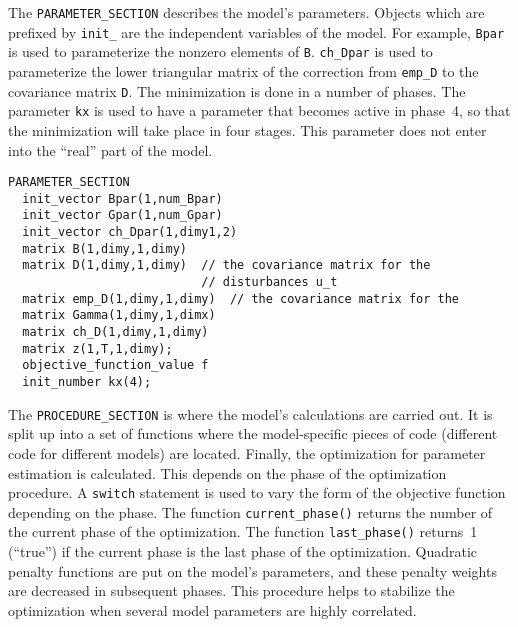 The \texttt{PARAMETER\_SECTION} describes the model's parameters.
Objects which are prefixed by \texttt{init\_} are the independent
variables of the model.  For example, \texttt{Bpar} is used to
parameterize the nonzero elements of \texttt{B}.
\texttt{ch\_Dpar} is used to parameterize the lower triangular matrix
of the correction from \texttt{emp\_D} to the covariance matrix
\texttt{D}. The minimization is done in a number of phases.
The parameter \texttt{kx} is used to have a parameter that becomes active
in phase~4, so that the minimization will take place in four stages.
This parameter does not enter into the ``real'' part of the model.

\begin{lstlisting}
PARAMETER_SECTION
  init_vector Bpar(1,num_Bpar)
  init_vector Gpar(1,num_Gpar)
  init_vector ch_Dpar(1,dimy1,2)
  matrix B(1,dimy,1,dimy)
  matrix D(1,dimy,1,dimy)  // the covariance matrix for the 
                           // disturbances u_t
  matrix emp_D(1,dimy,1,dimy)  // the covariance matrix for the 
  matrix Gamma(1,dimy,1,dimx)
  matrix ch_D(1,dimy,1,dimy)
  matrix z(1,T,1,dimy);
  objective_function_value f
  init_number kx(4);
\end{lstlisting}

The \texttt{PROCEDURE\_SECTION} is where the model's calculations
are carried out. It is split up into a set of functions where the
model-specific pieces of code (different code for different models)
are located. Finally, the optimization for parameter estimation is
calculated. This depends on the phase of the optimization procedure.
A \texttt{switch} statement is used to vary the form of the objective
function depending on the phase. The function \texttt{current\_phase()}
returns the number of the current phase of the optimization.
The function \texttt{last\_phase()}
returns~1 (``true'') if the current phase is the last phase of the
optimization. Quadratic penalty functions are put on the model's parameters, and these penalty weights are decreased in subsequent phases.
This procedure helps to stabilize the optimization when several
model parameters are highly correlated.

